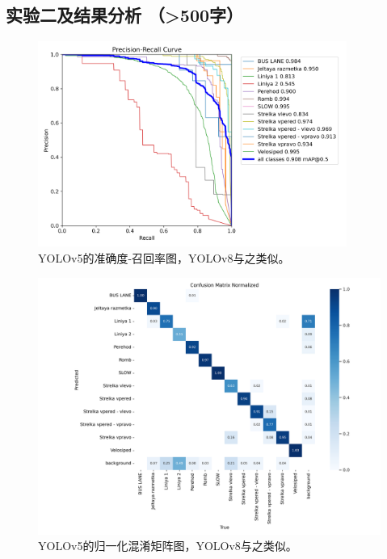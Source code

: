 \documentclass{article}
\begin{document}
\subsection{实验二及结果分析 （>500字）}

\begin{figure}[htpb]
    \centering
    \includegraphics[width=0.9\textwidth]{YOLOv5/train_yolov5/PR_curve.png}
    \caption{YOLOv5的准确度-召回率图，YOLOv8与之类似。}
    \label{fig:3}
\end{figure}


\begin{figure}[htpb]
    \centering
    \includegraphics[width=1\textwidth]{YOLOv5/train_yolov5/confusion_matrix_normalized.png}
    \caption{YOLOv5的归一化混淆矩阵图，YOLOv8与之类似。}
    \label{fig:4}
\end{figure}

\end{document}
